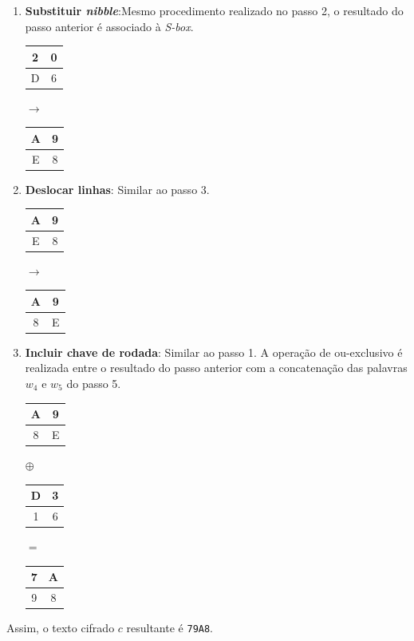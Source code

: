 \documentclass{article}
\begin{document}
\begin{enumerate}
    \item \textbf{Substituir \textit{nibble}}:Mesmo procedimento realizado no
    passo 2, o resultado do passo anterior é associado à \textit{S-box}.
    \begin{center}
        \begin{tabular}{|c|c|}
            \hline
            2 & 0  \\
            \hline
            D & 6 \\
            \hline
        \end{tabular}
        $\to$
        \begin{tabular}{|c|c|}
            \hline
            A & 9  \\
            \hline
            E & 8 \\
            \hline
        \end{tabular}
    \end{center}
    
    \item \textbf{Deslocar linhas}: Similar ao passo 3.
    \begin{center}
        \begin{tabular}{|c|c|}
            \hline
            A & 9  \\
            \hline
            E & 8 \\
            \hline
        \end{tabular}
        $\to$
        \begin{tabular}{|c|c|}
            \hline
            A & 9  \\
            \hline
            8 & E \\
            \hline
        \end{tabular}
    \end{center}
    
    \item \textbf{Incluir chave de rodada}: Similar ao passo 1. A operação de
    ou-exclusivo é realizada entre o resultado do passo anterior com a
    concatenação das palavras $w_{4}$ e $w_{5}$ do passo 5.
        \begin{center}
        \begin{tabular}{|c|c|}
            \hline
            A & 9  \\
            \hline
            8 & E \\
            \hline
        \end{tabular}
        $\oplus$
        \begin{tabular}{|c|c|}
            \hline
            D & 3  \\
            \hline
            1 & 6 \\
            \hline
        \end{tabular}
        $=$
        \begin{tabular}{|c|c|}
            \hline
            7 & A  \\
            \hline
            9 & 8 \\
            \hline
        \end{tabular}
    \end{center}
\end{enumerate}
Assim, o texto cifrado $c$ resultante é \texttt{79A8}.
\end{document}
